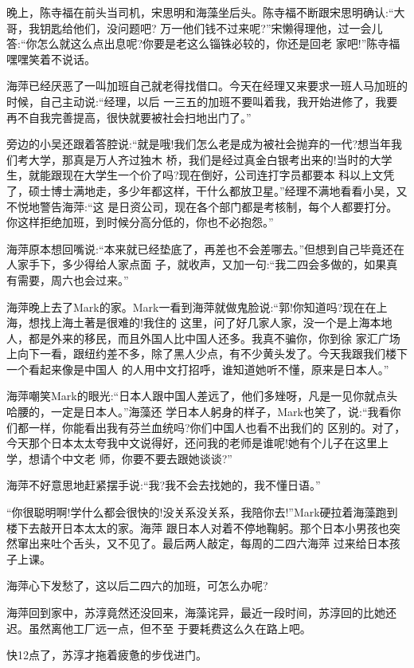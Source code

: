 \documentclass[11pt,a4paper,onecolumn]{article}
\begin{document}
晚上，陈寺福在前头当司机，宋思明和海藻坐后头。陈寺福不断跟宋思明确认:``大哥，我钥匙给他们，没问题吧?
万一他们钱不过来呢?''宋懒得理他，过一会儿答:``你怎么就这么点出息呢?你要是老这么锱铢必较的，你还是回老
家吧!''陈寺福嘿嘿笑着不说话。

海萍已经厌恶了一叫加班自己就老得找借口。今天在经理又来要求一班人马加班的时候，自己主动说:``经理，以后
一三五的加班不要叫着我，我开始进修了，我要再不自我完善提高，很快就要被社会扫地出门了。''

旁边的小吴还跟着答腔说:``就是哦!我们怎么老是成为被社会抛弃的一代?想当年我们考大学，那真是万人齐过独木
桥，我们是经过真金白银考出来的!当时的大学生，就能跟现在大学生一个价了吗?现在倒好，公司连打字员都要本
科以上文凭了，硕士博士满地走，多少年都这样，干什么都放卫星。''经理不满地看看小吴，又不悦地警告海萍:``这
是日资公司，现在各个部门都是考核制，每个人都要打分。你这样拒绝加班，到时候分高分低的，你也不必抱怨。''

海萍原本想回嘴说:``本来就已经垫底了，再差也不会差哪去。''但想到自己毕竟还在人家手下，多少得给人家点面
子，就收声，又加一句:``我二四会多做的，如果真有需要，周六也会过来。''

海萍晚上去了Mark的家。Mark一看到海萍就做鬼脸说:``郭!你知道吗?现在在上海，想找上海土著是很难的!我住的
这里，问了好几家人家，没一个是上海本地人，都是外来的移民，而且外国人比中国人还多。我真不骗你，你到徐
家汇广场上向下一看，跟纽约差不多，除了黑人少点，有不少黄头发了。今天我跟我们楼下一个看起来像是中国人
的人用中文打招呼，谁知道她听不懂，原来是日本人。''

海萍嘲笑Mark的眼光:``日本人跟中国人差远了，他们多矬呀，凡是一见你就点头哈腰的，一定是日本人。''海藻还
学日本人躬身的样子，Mark也笑了，说:``我看你们都一样，你能看出我有芬兰血统吗?你们中国人也看不出我们的
区别的。对了，今天那个日本太太夸我中文说得好，还问我的老师是谁呢!她有个儿子在这里上学，想请个中文老
师，你要不要去跟她谈谈?''

海萍不好意思地赶紧摆手说:``我?我不会去找她的，我不懂日语。''

``你很聪明啊!学什么都会很快的!没关系没关系，我陪你去!''Mark硬拉着海藻跑到楼下去敲开日本太太的家。海萍
跟日本人对着不停地鞠躬。那个日本小男孩也突然窜出来吐个舌头，又不见了。最后两人敲定，每周的二四六海萍
过来给日本孩子上课。

海萍心下发愁了，这以后二四六的加班，可怎么办呢?

海萍回到家中，苏淳竟然还没回来，海藻诧异，最近一段时间，苏淳回的比她还迟。虽然离他工厂远一点，但不至
于要耗费这么久在路上吧。

快12点了，苏淳才拖着疲惫的步伐进门。
\end{document}

